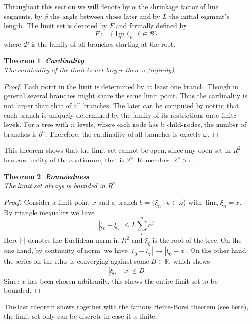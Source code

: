 \documentclass[17pt]{extarticle}
\newtheorem*{theorem*}{Theorem}
\begin{document}
Throughout this section we will denote by $\alpha$ the shrinkage factor of line segments, by $\beta$ the angle between those later and by $L$ the initial segment's length. The limit set is denoted by $F$ and formally defined by
$$
F:=\{\lim_{n}\xi_n \ | \ \xi\in \mathcal{B}\}
$$
where $\mathcal{B}$ is the family of all branches starting at the root.
	
\begin{theorem*}
	\textbf{Cardinality}\\
	The cardinality of the limit is not larger than $\omega$ (infinity).
\end{theorem*}
\begin{proof}
Each point in the limit is determined by at least one branch. Though in general several branches might share the same limit point. Thus the cardinality is not larger than that of all branches. The later can be computed by noting that each branch is uniquely determined by the family of its restrictions onto finite levels. For a tree with $n$ levels, where each node has b child-nodes, the number of branches is $b^n$. Therefore, the cardinality of all branches is exactly $\omega$.
\end{proof}

This theorem shows that the limit set cannot be open, since any open set in $R^2$ has cardinality of the continuum, that is $2^{\omega}$. Remember: $2^{\omega}>\omega$.

\begin{theorem*}
	\textbf{Boundedness}\\
	The limit set always is bounded in $R^2$.
\end{theorem*}
\begin{proof}
Consider a limit point $x$ and a branch $b=\{\xi_n \ | \ n\in\omega\}$ with $\lim_n \xi_n = x$. By triangle inequality we have
$$
|\xi_0 - \xi_n|\leq L\sum_i^n \alpha^i
$$
Here $|\cdot|$ denotes the Euclidean norm in $R^2$ and $\xi_0$ is the root of the tree.
On the one hand, by continuity of norm, we have $|\xi_0-\xi_n| \rightarrow |\xi_0-x|$. On the other hand the series on the r.h.s is converging against some $B\in\mathbb{R}$,
which shows
$$
|\xi_0 - x|\leq B
$$
Since $x$ has been chosen arbitrarily, this shows the entire limit set to be bounded.
\end{proof}

The last theorem shows together with the famous Heine-Borel theorem (\href{https://en.wikipedia.org/wiki/Heine\%E2\%80\%93Borel_theorem}{see here}), the limit set only can be discrete in case it is finite.
\end{document}
